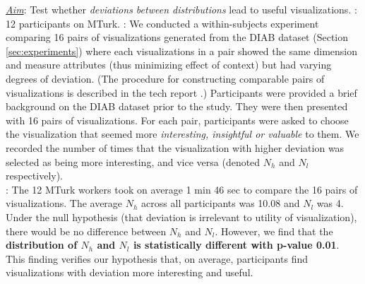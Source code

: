 {\it \underline{Aim}}: Test whether {\it deviations between distributions} lead to useful visualizations.
: 12 participants on MTurk.
: 
We conducted a within-subjects experiment comparing 16 pairs of visualizations generated 
from the DIAB dataset (Section \ref{sec:experiments}) 
where each visualizations in a pair showed the same dimension and measure attributes (thus minimizing effect of context) but had varying degrees of deviation. 
(The procedure for constructing comparable pairs of visualizations is described in the tech report \cite{}.)
Participants were provided a brief background on the DIAB dataset prior to the study.
They were then presented with 16 pairs of visualizations. 
For each pair, participants were asked to choose the visualization that seemed more {\it interesting, insightful or valuable} to them.
We recorded the number of times that the visualization with higher deviation was selected as being more interesting, and vice versa (denoted $N_h$ and $N_l$ respectively).
\\
: The 12 MTurk workers took on average 
1 min 46 sec to compare the 16 pairs of visualizations.
The average $N_h$ across all participants was 10.08 and $N_l$ was 4.
Under the null hypothesis (that deviation is irrelevant to utility of visualization),
there would be no difference between $N_{h}$ and $N_{l}$.
However, we find that the {\bf distribution of $N_{h}$ and $N_{l}$ is statistically different with
p-value 0.01}.
This finding verifies our hypothesis that, on average, participants 
find visualizations with deviation more interesting and useful.



